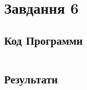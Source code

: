 \section{Завдання 6}
\label{sec:task6}

\subsection{Код Программи}
\label{subsec:task6_code}
\inputminted{python}{../src/task6.py}

\subsection{Результати}
\label{subsec:task6_results}
